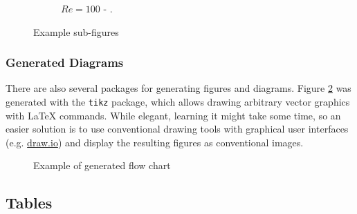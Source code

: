 \begin{figure}[H]
\begin{subfigure}[t]{0.441\textwidth}
        \caption*{$Re = 100$ - \citet{ghia_et_al}.}
    \end{subfigure}
    \caption{Example sub-figures}
    \label{fig:example-sub-figure}
\end{figure}


\subsubsection{Generated Diagrams}

There are also several packages for generating figures and diagrams.
Figure \ref{fig:example-flow-chart} was generated with the \verb|tikz| package, which allows drawing arbitrary vector graphics with LaTeX commands.
While elegant, learning it might take some time, so an easier solution is to use conventional drawing tools with graphical user interfaces (e.g. \url{draw.io}) and display the resulting figures as conventional images.

\begin{figure}[H]
    \centering
    \caption{Example of generated flow chart}
    \label{fig:example-flow-chart}
\end{figure}


\subsection{Tables}
\label{app:tables}

